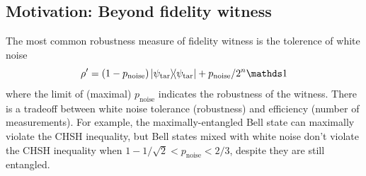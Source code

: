 \documentclass[
reprint,
aps,
pra,
floatfix,
]{revtex4-2}
\theoremstyle{plain}
\newtheorem{theorem}{Theorem}
\theoremstyle{definition}
\newtheorem{example}{Example}
\newcommand{\dm}{\rho}
\newcommand{\target}{\textup{tar}}
\newcommand{\noise}{\text{noise}}
\begin{document}
\subsection{Motivation: Beyond fidelity witness}
The most common robustness measure of fidelity witness is the tolerence of white noise
\begin{equation}\label{eq:white_noise}
	\dm'
	= (1-p_{\noise}) \op{\psi_{\target}} + p_{\noise}/2^{n} \identity
\end{equation}
where the limit of (maximal) $p_{\noise}$ indicates the robustness of the witness.
There is a tradeoff between white noise tolerance (robustness) and efficiency (number of measurements).
For example, the maximally-entangled Bell state can maximally violate the CHSH inequality, 
but Bell states mixed with white noise don't violate the CHSH inequality when $ 1- 1/ \sqrt{2} < p_{\noise}<2/3 $, despite they are still entangled.
\end{document}
